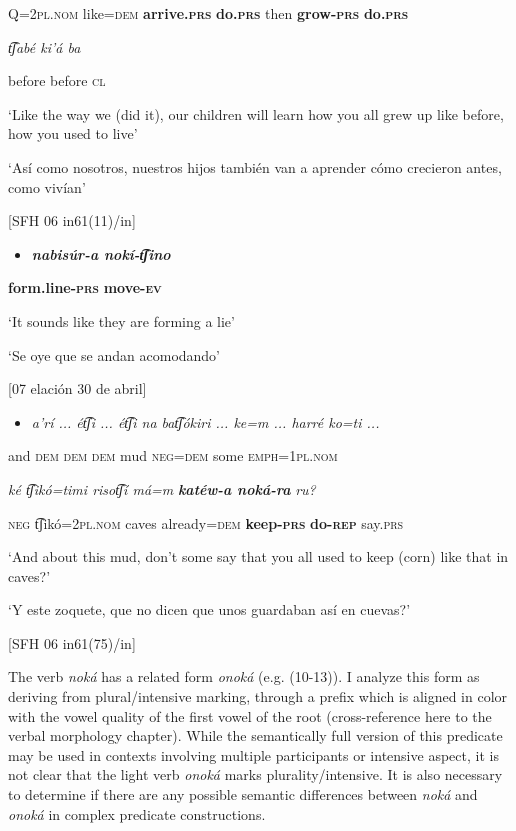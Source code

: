 Q=2\textsc{pl.nom}  like=\textsc{dem}  \textbf{arrive.\textsc{prs}} \textbf{do\textsc{.prs}}  then  \textbf{grow-\textsc{prs} }\textbf{do\textsc{.prs} }

\textit{t͡ʃabé    ki’á   ba}

  before     before  \textsc{cl}

‘Like the way we (did it), our children will learn how you all grew up like before, how you used to live’

‘Así como nosotros, nuestros hijos también van a aprender cómo crecieron antes, como vivían’

 [SFH 06 in61(11)/in]

\begin{itemize}
\item \textbf{\textit{nabisúr-a   nokí-t͡ʃino}}
\end{itemize}

\textbf{form.line-\textsc{prs}} \textbf{move-\textsc{ev}} 

‘It sounds like they are forming a lie’    

‘Se oye que se andan acomodando’

[07 elación 30 de abril]

\begin{itemize}
\item \textit{a’rí ...   ét͡ʃi ...  ét͡ʃi   na   bat͡ʃókiri ...  ke=m ...  harré   ko=ti ...}
\end{itemize}

  and  \textsc{dem}  \textsc{dem}  \textsc{dem}  mud    \textsc{neg}=\textsc{dem} some  \textsc{emph}=1\textsc{pl.nom}

\textit{ké   t͡ʃikó=timi     risot͡ʃí má=m} \textbf{\textit{katéw-a   noká-ra}} \textit{ru?} 

\textsc{neg}  t͡ʃikó=2\textsc{pl.nom} caves  already=\textsc{dem} \textbf{keep-\textsc{prs}} \textbf{do-\textsc{rep}}    say.\textsc{prs}

‘And about this mud, don’t some say that you all used to keep (corn) like that in caves?’

‘Y este zoquete, que no dicen que unos guardaban así en cuevas?’

  [SFH 06 in61(75)/in]

 The verb \textit{noká} has a related form \textit{onoká} (e.g. (10-13)). I analyze this form as deriving from plural/intensive marking, through a prefix which is aligned in color with the vowel quality of the first vowel of the root (cross-reference here to the verbal morphology chapter). While the semantically full version of this predicate may be used in contexts involving multiple participants or intensive aspect, it is not clear that the light verb \textit{onoká} marks plurality/intensive. It is also necessary to determine if there are any possible semantic differences between \textit{noká} and \textit{onoká} in complex predicate constructions.

